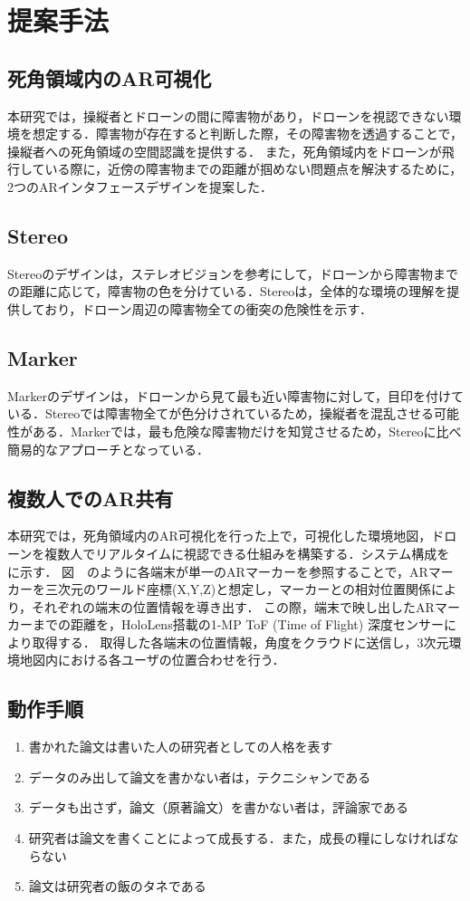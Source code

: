 \documentclass[a4paper,10pt,twocolumn,uplatex]{jsarticle}
\begin{document}

\section{提案手法}\label{discussion}
\subsection{死角領域内のAR可視化}
本研究では，操縦者とドローンの間に障害物があり，ドローンを視認できない環境を想定する．障害物が存在すると判断した際，その障害物を透過することで，操縦者への死角領域の空間認識を提供する．
また，死角領域内をドローンが飛行している際に，近傍の障害物までの距離が掴めない問題点を解決するために，2つのARインタフェースデザインを提案した．

\subsection{Stereo}
Stereoのデザインは，ステレオビジョンを参考にして，ドローンから障害物までの距離に応じて，障害物の色を分けている．Stereoは，全体的な環境の理解を提供しており，ドローン周辺の障害物全ての衝突の危険性を示す．

\subsection{Marker}
Markerのデザインは，ドローンから見て最も近い障害物に対して，目印を付けている．Stereoでは障害物全てが色分けされているため，操縦者を混乱させる可能性がある．Markerでは，最も危険な障害物だけを知覚させるため，Stereoに比べ簡易的なアプローチとなっている．

\subsection{複数人でのAR共有}
本研究では，死角領域内のAR可視化を行った上で，可視化した環境地図，ドローンを複数人でリアルタイムに視認できる仕組みを構築する．システム構成を　に示す．
図　のように各端末が単一のARマーカーを参照することで，ARマーカーを三次元のワールド座標(X,Y,Z)と想定し，マーカーとの相対位置関係により，それぞれの端末の位置情報を導き出す．
この際，端末で映し出したARマーカーまでの距離を，HoloLens搭載の1-MP ToF (Time of Flight) 深度センサーにより取得する．
取得した各端末の位置情報，角度をクラウドに送信し，3次元環境地図内における各ユーザの位置合わせを行う．

\subsection{動作手順}
\begin{enumerate}
  \item 書かれた論文は書いた人の研究者としての人格を表す
  \item データのみ出して論文を書かない者は，テクニシャンである
  \item データも出さず，論文（原著論文）を書かない者は，評論家である
  \item 研究者は論文を書くことによって成長する．また，成長の糧にしなければならない
  \item 論文は研究者の飯のタネである
\end{enumerate}
\end{document}
